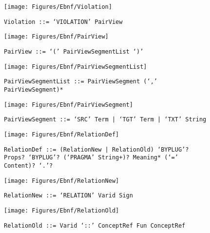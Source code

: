  \begin{figure}[H]
  \centering
  \texttt{[image: Figures/Ebnf/Violation]}
  \caption*{\texttt{Violation \small::=  `VIOLATION' PairView}}
  \label{fig:ebnf-Violation}
 \end{figure}

 \begin{figure}[H]
  \centering
  \texttt{[image: Figures/Ebnf/PairView]}
  \caption*{\texttt{PairView \small::=  `(' PairViewSegmentList `)'}}
  \label{fig:ebnf-PairView}
 \end{figure}

 \begin{figure}[H]
  \centering
  \texttt{[image: Figures/Ebnf/PairViewSegmentList]}
  \caption*{\texttt{PairViewSegmentList \small::=  PairViewSegment (`,' PairViewSegment)*}}
  \label{fig:ebnf-PairViewSegmentList}
 \end{figure}

 \begin{figure}[H]
  \centering
  \texttt{[image: Figures/Ebnf/PairViewSegment]}
  \caption*{\texttt{PairViewSegment \small::=  `SRC' Term | `TGT' Term | `TXT' String}}
  \label{fig:ebnf-PairViewSegment}
 \end{figure}

 \begin{figure}[H]
  \centering
  \texttt{[image: Figures/Ebnf/RelationDef]}
  \caption*{\texttt{RelationDef \small::=  (RelationNew | RelationOld) `BYPLUG'? Props? `BYPLUG'? (`PRAGMA' String+)? Meaning* (`=' Content)? `.'?}}
  \label{fig:ebnf-RelationDef}
 \end{figure}

 \begin{figure}[H]
  \centering
  \texttt{[image: Figures/Ebnf/RelationNew]}
  \caption*{\texttt{RelationNew \small::=  `RELATION' Varid Sign}}
  \label{fig:ebnf-RelationNew}
 \end{figure}

 \begin{figure}[H]
  \centering
  \texttt{[image: Figures/Ebnf/RelationOld]}
  \caption*{\texttt{RelationOld \small::=  Varid `::' ConceptRef Fun ConceptRef}}
  \label{fig:ebnf-RelationOld}
 \end{figure}

